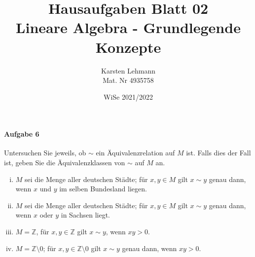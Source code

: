 \documentclass{scrreprt}
\author{Karsten Lehmann\\Mat. Nr 4935758}
\date{WiSe 2021/2022}
\title{Hausaufgaben Blatt 02\\Lineare Algebra - Grundlegende Konzepte}
\begin{document}
\paragraph{Aufgabe 6} Untersuchen Sie jeweils, ob $\sim$ ein Äquivalenzrelation
auf $M$ ist.
Falls dies der Fall ist, geben Sie die Äquivalenzklassen von $\sim$ auf $M$ an.
\begin{enumerate}[(i)]
\item $M$ sei die Menge aller deutschen Städte; für $x, y \in M$ gilt
  $x \sim y$ genau dann, wenn $x$ und $y$ im selben Bundesland liegen.

\item $M$ sei die Menge aller deutschen Städte; für $x, y \in M$ gilt
  $x \sim y$ genau dann, wenn $x$ oder $y$ in Sachsen liegt.

\item $M = \mathbb{Z}$, für $x, y \in \mathbb{Z}$ gilt $x \sim y$, wenn
  $xy > 0$.

\item $M = \mathbb{Z} \setminus \qty{0}$; für
  $x, y \in \mathbb{Z} \setminus \qty{0}$ gilt $x \sim y$ genau dann, wenn
  $xy > 0$.
\end{enumerate}
\end{document}
